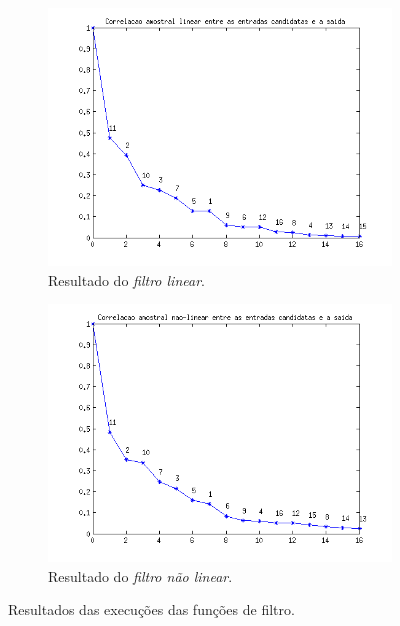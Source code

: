 \begin{enumerate}
\begin{enumerate}
\begin{figure}[H]
					\begin{subfigure}{.5\textwidth}
					  \centering
					  \includegraphics[width=1\linewidth]{image/filtro_lin2}
					  \caption{Resultado do \textit{filtro linear}.}
					  \label{fig:filtro_lin2}
					\end{subfigure}%
					\begin{subfigure}{.5\textwidth}
					  \centering
					  \includegraphics[width=1\linewidth]{image/filtro_nlin2}
					  \caption{Resultado do \textit{filtro não linear}.}
					  \label{fig:filtro_nlin2}
				\end{subfigure}
				
				\caption{Resultados das execuções das funções de filtro.}
				\end{figure}
				

\end{enumerate}
\end{enumerate}
